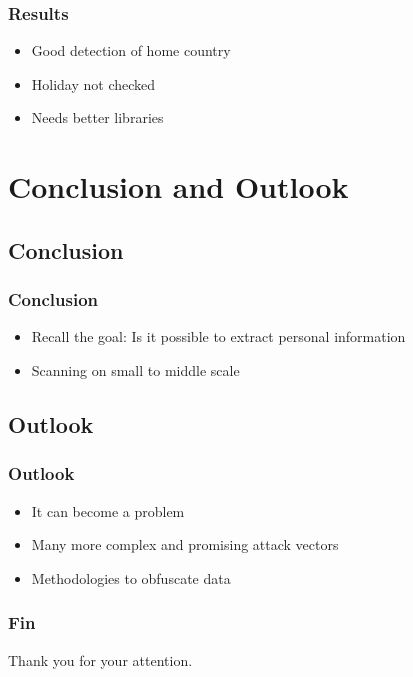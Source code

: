 \documentclass{beamer}
\begin{document}
\begin{frame}
    \frametitle{Results}
    \begin{itemize}
        \item Good detection of home country
        \pause{}
        \item Holiday not checked
        \pause{}
        \item Needs better libraries
    \end{itemize}
\end{frame}

\section{Conclusion and Outlook}
\subsection{Conclusion}
\begin{frame}
    \frametitle{Conclusion}
    \begin{itemize}
        \item Recall the goal: Is it possible to extract personal information
        \pause{}
        \item Scanning on small to middle scale
    \end{itemize}
\end{frame}

\subsection{Outlook}
\begin{frame}
    \frametitle{Outlook}
    \begin{itemize}
        \item It can become a problem
        \pause{}
        \item Many more complex and promising attack vectors
        \pause{}
        \item Methodologies to obfuscate data
    \end{itemize}
\end{frame}


\begin{frame}
    \frametitle{Fin}
    Thank you for your attention.
\end{frame}
\end{document}
